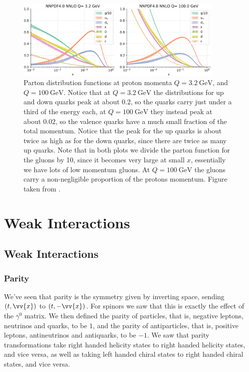 \documentclass[fleqn]{NotesClass}
\begin{document}
    \begin{figure}
        \includegraphics[width=0.9\textwidth]{images/parton-distribution-function}
        \caption[Parton distribution function]{Parton distribution functions at proton momenta \(Q = \qty{3.2}{\giga\electronvolt}\), and \(Q = \qty{100}{\giga\electronvolt}\). Notice that at \(Q = \qty{3.2}{\giga\electronvolt}\) the distributions for up and down quarks peak at about \(0.2\), so the quarks carry just under a third of the energy each, at \(Q = \qty{100}{\giga\electronvolt}\) they instead peak at about \(0.02\), so the valence quarks have a much small fraction of the total momentum. Notice that the peak for the up quarks is about twice as high as for the down quarks, since there are twice as many up quarks. Note that in both plots we divide the parton function for the gluons by 10, since it becomes very large at small \(x\), essentially we have lots of low momentum gluons. At \(Q = \qty{100}{\giga\electronvolt}\) the gluons carry a non-negligible proportion of the protons momentum. Figure taken from \cite{ball}.}
        \label{fig:parton distribution function}
    \end{figure}
    
    \part{Weak Interactions}
    \chapter{Weak Interactions}
    \section{Parity}
    We've seen that parity is the symmetry given by inverting space, sending \((t, \vv{x})\) to \((t, -\vv{x})\).
    For spinors we saw that this is exactly the effect of the \(\gamma^0\) matrix.
    We then defined the parity of particles, that is, negative leptons, neutrinos and quarks, to be \(1\), and the parity of antiparticles, that is, positive leptons, antineutrinos and antiquarks, to be \(-1\).
    We saw that parity transformations take right handed helicity states to right handed helicity states, and vice versa, as well as taking left handed chiral states to right handed chiral states, and vice versa.
    
\end{document}

